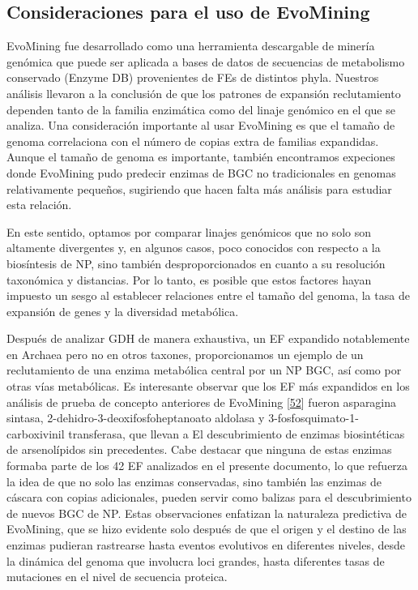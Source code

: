 \documentclass[12pt,twoside]{reedthesis}
\begin{document}
  \subsection{Consideraciones para el uso de
  EvoMining}\label{consideraciones-para-el-uso-de-evomining}
  
  EvoMining fue desarrollado como una herramienta descargable de minería
  genómica que puede ser aplicada a bases de datos de secuencias de
  metabolismo conservado (Enzyme DB) provenientes de FEs de distintos
  phyla. Nuestros análisis llevaron a la conclusión de que los patrones de
  expansión reclutamiento dependen tanto de la familia enzimática como del
  linaje genómico en el que se analiza. Una consideración importante al
  usar EvoMining es que el tamaño de genoma correlaciona con el número de
  copias extra de familias expandidas. Aunque el tamaño de genoma es
  importante, también encontramos expeciones donde EvoMining pudo predecir
  enzimas de BGC no tradicionales en genomas relativamente pequeños,
  sugiriendo que hacen falta más análisis para estudiar esta relación.
  
  En este sentido, optamos por comparar linajes genómicos que no solo son
  altamente divergentes y, en algunos casos, poco conocidos con respecto a
  la biosíntesis de NP, sino también desproporcionados en cuanto a su
  resolución taxonómica y distancias. Por lo tanto, es posible que estos
  factores hayan impuesto un sesgo al establecer relaciones entre el
  tamaño del genoma, la tasa de expansión de genes y la diversidad
  metabólica.
  
  Después de analizar GDH de manera exhaustiva, un EF expandido
  notablemente en Archaea pero no en otros taxones, proporcionamos un
  ejemplo de un reclutamiento de una enzima metabólica central por un NP
  BGC, así como por otras vías metabólicas. Es interesante observar que
  los EF más expandidos en los análisis de prueba de concepto anteriores
  de EvoMining
  {[}\protect\hyperlink{ref-cruz-morales_phylogenomic_2016}{52}{]} fueron
  asparagina sintasa, 2-dehidro-3-deoxifosfoheptanoato aldolasa y
  3-fosfosquimato-1-carboxivinil transferasa, que llevan a El
  descubrimiento de enzimas biosintéticas de arsenolípidos sin
  precedentes. Cabe destacar que ninguna de estas enzimas formaba parte de
  los 42 EF analizados en el presente documento, lo que refuerza la idea
  de que no solo las enzimas conservadas, sino también las enzimas de
  cáscara con copias adicionales, pueden servir como balizas para el
  descubrimiento de nuevos BGC de NP. Estas observaciones enfatizan la
  naturaleza predictiva de EvoMining, que se hizo evidente solo después de
  que el origen y el destino de las enzimas pudieran rastrearse hasta
  eventos evolutivos en diferentes niveles, desde la dinámica del genoma
  que involucra loci grandes, hasta diferentes tasas de mutaciones en el
  nivel de secuencia proteica.
  
\end{document}
